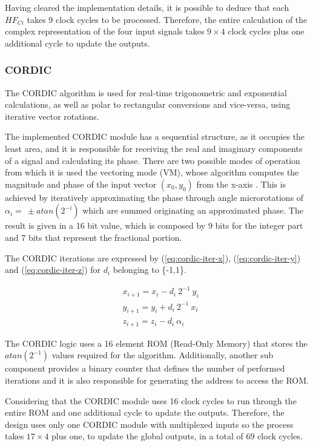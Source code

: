 Having cleared the implementation details, it is possible to deduce that each $HF_{Ci}$ takes 9 clock cycles to be processed. Therefore, the entire calculation of the complex representation of the four input signals takes $9 \times 4$ clock cycles plus one additional cycle to update the outputs.

\subsubsection{CORDIC}

The CORDIC algorithm is used for real-time trigonometric and exponential calculations, as well as polar to rectangular conversions and vice-versa, using iterative vector rotations. 

The implemented CORDIC module has a sequential structure, as it occupies the least area, and it is responsible for receiving the real and imaginary components of a signal and calculating its phase. There are two possible modes of operation from which it is used the vectoring mode (VM), whose algorithm computes the magnitude and phase of the input vector $(x_0, y_0)$ from the x-axis \cite{cordic-def}. This is achieved by iteratively approximating the phase through angle microrotations of $\alpha_i = \ \pm atan(2^{-i})$ which are summed originating an approximated phase. The result is given in a 16 bit value, which is composed by 9 bits for the integer part and 7 bits that represent the fractional portion. 

The CORDIC iterations are expressed by (\ref{eq:cordic-iter-x}), (\ref{eq:cordic-iter-y}) and (\ref{eq:cordic-iter-z}) for $d_i$ belonging to \{-1,1\}.

\begin{eqnarray}
	& x_{i+1} = x_i - d_i \ 2^{-1} \ y_i
	\label{eq:cordic-iter-x}  \\
	& y_{i+1} = y_i + d_i \ 2^{-1} \ x_i
	\label{eq:cordic-iter-y} \\
	& z_{i+1} = z_i - d_i \ \alpha_i
	\label{eq:cordic-iter-z}
\end{eqnarray}

The CORDIC logic uses a 16 element ROM (Read-Only Memory) that stores the $atan(2^{-1})$ values required for the algorithm. Additionally, another sub component provides a binary counter that defines the number of performed iterations and it is also responsible for generating the address to access the ROM. 

Considering that the CORDIC module uses 16 clock cycles to run through the entire ROM and one additional cycle to update the outputs. Therefore, the design uses only one CORDIC module with multiplexed inputs so the process takes $17 \times 4$ plus one, to update the global outputs, in a total of 69 clock cycles.

